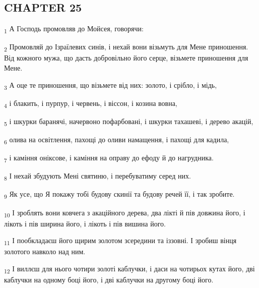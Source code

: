 \subsection{CHAPTER 25}
\begin{tcolorbox}
\textsubscript{1} А Господь промовляв до Мойсея, говорячи:
\end{tcolorbox}
\begin{tcolorbox}
\textsubscript{2} Промовляй до Ізраїлевих синів, і нехай вони візьмуть для Мене приношення. Від кожного мужа, що дасть добровільно його серце, візьмете приношення для Мене.
\end{tcolorbox}
\begin{tcolorbox}
\textsubscript{3} А оце те приношення, що візьмете від них: золото, і срібло, і мідь,
\end{tcolorbox}
\begin{tcolorbox}
\textsubscript{4} і блакить, і пурпур, і червень, і віссон, і козина вовна,
\end{tcolorbox}
\begin{tcolorbox}
\textsubscript{5} і шкурки баранячі, начервоно пофарбовані, і шкурки тахашеві, і дерево акацій,
\end{tcolorbox}
\begin{tcolorbox}
\textsubscript{6} олива на освітлення, пахощі до оливи намащення, і пахощі для кадила,
\end{tcolorbox}
\begin{tcolorbox}
\textsubscript{7} і каміння оніксове, і каміння на оправу до ефоду й до нагрудника.
\end{tcolorbox}
\begin{tcolorbox}
\textsubscript{8} І нехай збудують Мені святиню, і перебуватиму серед них.
\end{tcolorbox}
\begin{tcolorbox}
\textsubscript{9} Як усе, що Я покажу тобі будову скинії та будову речей її, і так зробите.
\end{tcolorbox}
\begin{tcolorbox}
\textsubscript{10} І зроблять вони ковчега з акаційного дерева, два лікті й пів довжина його, і лікоть і пів ширина його, і лікоть і пів вишина його.
\end{tcolorbox}
\begin{tcolorbox}
\textsubscript{11} І пообкладаєш його щирим золотом зсередини та іззовні. І зробиш вінця золотого навколо над ним.
\end{tcolorbox}
\begin{tcolorbox}
\textsubscript{12} І виллєш для нього чотири золоті каблучки, і даси на чотирьох кутах його, дві каблучки на одному боці його, і дві каблучки на другому боці його.
\end{tcolorbox}
